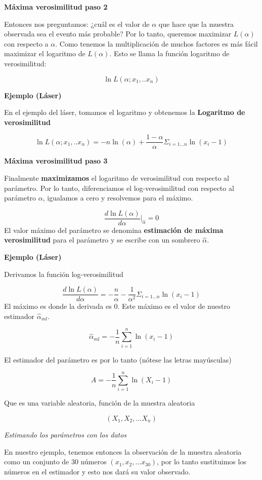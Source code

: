 \documentclass[
]{book}
\begin{document}
\textbf{Máxima verosimilitud paso 2}

Entonces nos preguntamos: ¿cuál es el valor de \(\alpha\) que hace que la muestra observada sea el evento más probable? Por lo tanto, queremos maximizar \(L(\alpha)\) con respecto a \(\alpha\). Como tenemos la multiplicación de muchos factores es más fácil maximizar el logaritmo de \(L(\alpha)\). Esto se llama la función logaritmo de verosimilitud:

\[\ln L(\alpha;x_1,..x_n)\]

\textbf{Ejemplo (Láser)}

En el ejemplo del láser, tomamos el logaritmo y obtenemos la \textbf{Logaritmo de verosimilitud}

\[\ln L(\alpha;x_1,..x_n)= -n \ln(\alpha) + {\frac{1-\alpha}{\alpha}} \Sigma_{i=1...n} \ln (x_i-1)\]

\textbf{Máxima verosimilitud paso 3}

Finalmente \textbf{maximizamos} el logaritmo de verosimilitud con respecto al parámetro. Por lo tanto, diferenciamos el log-verosimilitud con respecto al parámetro \(\alpha\), igualamos a cero y resolvemos para el máximo.

\[\frac{d \ln L(\alpha)}{d \alpha} \big|_{\hat{\alpha}}=0 \]
El valor máximo del parámetro se denomina \textbf{estimación de máxima verosimilitud} para el parámetro y se escribe con un sombrero \(\hat{\alpha}\).

\textbf{Ejemplo (Láser)}

Derivamos la función log-verosimilitud

\[\frac{d \ln L(\alpha)}{d \alpha}= -\frac{n}{\alpha} - \frac{1}{\alpha^2} \Sigma_{i=1.. .n} \ln (x_i-1)\]
El máximo es donde la derivada es \(0\). Este máximo es el valor de nuestro estimador \(\hat{\alpha}_{ml}\).

\[\hat{\alpha}_{ml}=-\frac{1}{n}\sum_{i=1}^n \ln (x_i-1)\]

El estimador del parámetro es por lo tanto (nótese las letras mayúsculas)

\[A=-\frac{1}{n}\sum_{i=1}^n \ln (X_i-1)\]

Que es una variable aleatoria, función de la muestra aleatoria

\[(X_1, X_2, ... X_n)\]

\emph{Estimando los parámetros con los datos}

En nuestro ejemplo, tenemos entonces la observación de la muestra aleatoria como un conjunto de 30 números \((x_1, x_2, ...x_{30})\), por lo tanto sustituimos los números en el estimador y esto nos dará su valor observado.
\end{document}
